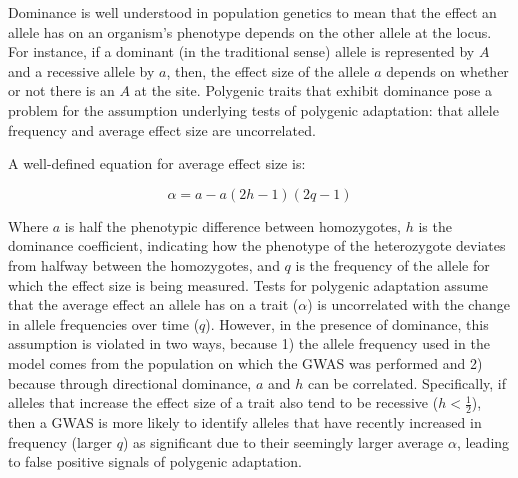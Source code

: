 \documentclass[a4paper,10pt]{article}
\begin{document}
\begin{comment}
  Ok, this is getting close, but I think there are still a couple things to unwind here.
  The second equation below is not really a feature of tests of polygenic adaptation, but rather is just a fact about the way that the average effect size depends on the difference between homozygotes, dominance, and the current allele frequency in the population. Above, you've already motivated the fact that tests of polygenic adaptation assume independence of the average effect and patterns of change in allele frequency. Now I think before you get to equation 2 you want to introduce the idea of dominance (you haven't done that up to this point), i.e. when the effect of an allele on a phentoype depends on the identity of the other allele at that site, and then you can say that the presence of dominance violates this assumption of independence between allele frequency and average effect. Then show the equation and explain what the individual pieces are.
  \end{comment}


Dominance is well understood in population genetics to mean that the
effect an allele has on an organism's phenotype depends on the other
allele at the locus. For instance, if a dominant (in the traditional
sense) allele is represented by $A$ and a recessive allele by $a$,
then, the effect size of the allele $a$ depends on whether or not
there is an $A$ at the site. Polygenic traits that exhibit dominance
pose a problem for the assumption underlying tests of polygenic
adaptation: that allele frequency and average effect size
are uncorrelated. 

A well-defined equation for average effect size is: 

\begin{equation}
  \alpha = a - a(2h - 1)(2q - 1)
\end{equation}

Where $a$ is half the phenotypic difference between homozygotes, $h$ is the
dominance coefficient, indicating how the phenotype of the heterozygote deviates from halfway between the homozygotes, and $q$ is the frequency of the allele for which
the effect size is being measured. Tests for polygenic adaptation
assume that the average effect an allele has on a trait ($\alpha$) is
uncorrelated with the change in allele frequencies over time
($q$). However, in the presence of dominance, this assumption is violated in two ways, because 1)
the allele frequency used in the model comes from the population on
which the GWAS was performed and 2) because through directional
dominance, $a$ and $h$ can be correlated. Specifically, if alleles that
increase the effect size of a trait also tend to be recessive
($h<\frac{1}{2}$), then a GWAS is more likely to identify alleles that have
recently increased in frequency (larger $q$) as significant due to
their seemingly larger average $\alpha$, leading to false
positive signals of polygenic adaptation.
\end{document}
